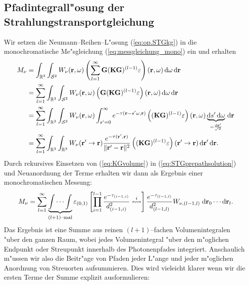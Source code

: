 \documentclass[11pt,a4paper,DIVcalc,BCOR8mm,titlepage,twoside]{scrartcl}
\begin{document}
	\subsection{Pfadintegrall"osung der Strahlungstransportgleichung}
	Wir setzen die Neumann--Reihen--L"osung (\ref{eq:op.STGkg}) in die monochromatische Me"sgleichung (\ref{eq:messgleichung_mono}) ein und erhalten
	\begin{align}
		M_\nu&=\int_{\mathbb{R}^3}\int_{\mathcal{S}^2}W_\nu(\mathbf{r},\omega) \left(\sum_{l=1}^\infty \mathbf{G} (\mathbf{KG})^{(l-1)} \varepsilon\right)(\mathbf{r},\omega) \,\text{d}\omega \,\text{d}\mathbf{r} \nonumber \\
		&=\sum_{l=1}^\infty \int_{\mathbb{R}^3}\int_{\mathcal{S}^2}W_\nu(\mathbf{r},\omega) \left(\mathbf{G} (\mathbf{KG})^{(l-1)} \varepsilon\right)(\mathbf{r},\omega) \,\text{d}\omega \,\text{d}\mathbf{r} \nonumber \\
		&=\sum_{l=1}^\infty \int_{\mathbb{R}^3}\int_{\mathcal{S}^2}W_\nu(\mathbf{r},\omega) \int_{s'=0}^\infty e^{-\tau(\mathbf{r}-s' \omega,\mathbf{r})} \left((\mathbf{KG})^{(l-1)} \varepsilon\right)(\mathbf{r},\omega) \underbrace{\text{d}s' \,\text{d}\omega}_{=\frac{\text{d}\mathbf{r}'}{s'^2}} \,\text{d}\mathbf{r} \nonumber \\
		&=\sum_{l=1}^\infty \int_{\mathbb{R}^3}\int_{\mathbb{R}^3}W_\nu(\mathbf{r}'\rightarrow\mathbf{r}) \frac{e^{-\tau(\mathbf{r}',\mathbf{r})}}{\|\mathbf{r}'-\mathbf{r}\|^2} \left((\mathbf{KG})^{(l-1)} \varepsilon\right)(\mathbf{r}'\rightarrow\mathbf{r}) \,\text{d}\mathbf{r}' \,\text{d}\mathbf{r}.
		\label{eq:STGprepathsolution}
	\end{align}
	Durch rekursives Einsetzen von (\ref{eq:KGvolume}) in (\ref{eq:STGprepathsolution}) und Neuanordnung der Terme erhalten wir dann als Ergebnis einer monochromatischen Messung:
	\begin{equation}
		M_\nu=\sum_{l=1}^\infty \underbrace{\idotsint}_{(l+1)\text{--mal}}\varepsilon_{(0,1)}\left[\prod_{i=1}^{l-1}\frac{e^{-\tau_{(i-1,i)}}}{d_{(i-1,i)}^2}\overset{i}{\leftrightsquigarrow}\right]\frac{e^{-\tau_{(l-1,l)}}}{d_{(l-1,l)}^2} W_{\nu,(l-1,l)} \;\text{d}\mathbf{r}_0 \dotsm \text{d}\mathbf{r}_l .
		\label{eq:STGpathsolution}
	\end{equation}
	Das Ergebnis ist eine Summe aus reinen $(l+1)$--fachen Volumenintegralen "uber den ganzen Raum, wobei jedes Volumenintegral "uber den m"oglichen Endpunkt oder Streupunkt innerhalb des Photonenpfades integriert.
	Anschaulich m"ussen wir also die Beitr"age von Pfaden jeder L"ange und jeder m"oglichen Anordnung von Streuorten aufsummieren. Dies wird vieleicht klarer wenn wir die ersten Terme der Summe explizit ausformulieren:
\end{document}
